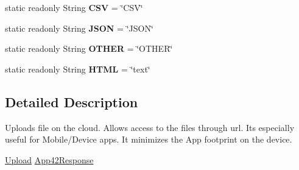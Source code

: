 \begin{DoxyCompactItemize}
\item 
\hypertarget{classcom_1_1shephertz_1_1app42_1_1paas_1_1sdk_1_1windows_1_1upload_1_1_upload_file_type_ac5126d7599593fc0a2a886ef81642c57}{static readonly String {\bfseries C\+S\+V} = \char`\"{}C\+S\+V\char`\"{}}\label{classcom_1_1shephertz_1_1app42_1_1paas_1_1sdk_1_1windows_1_1upload_1_1_upload_file_type_ac5126d7599593fc0a2a886ef81642c57}

\item 
\hypertarget{classcom_1_1shephertz_1_1app42_1_1paas_1_1sdk_1_1windows_1_1upload_1_1_upload_file_type_a92d4c8543bb23be8ea4b3d39267523f0}{static readonly String {\bfseries J\+S\+O\+N} = \char`\"{}J\+S\+O\+N\char`\"{}}\label{classcom_1_1shephertz_1_1app42_1_1paas_1_1sdk_1_1windows_1_1upload_1_1_upload_file_type_a92d4c8543bb23be8ea4b3d39267523f0}

\item 
\hypertarget{classcom_1_1shephertz_1_1app42_1_1paas_1_1sdk_1_1windows_1_1upload_1_1_upload_file_type_a3ef399205ff0820c7bd562d861560da7}{static readonly String {\bfseries O\+T\+H\+E\+R} = \char`\"{}O\+T\+H\+E\+R\char`\"{}}\label{classcom_1_1shephertz_1_1app42_1_1paas_1_1sdk_1_1windows_1_1upload_1_1_upload_file_type_a3ef399205ff0820c7bd562d861560da7}

\item 
\hypertarget{classcom_1_1shephertz_1_1app42_1_1paas_1_1sdk_1_1windows_1_1upload_1_1_upload_file_type_ad1b395d57ab0e2f41da31d4e8b5e1bb1}{static readonly String {\bfseries H\+T\+M\+L} = \char`\"{}text\char`\"{}}\label{classcom_1_1shephertz_1_1app42_1_1paas_1_1sdk_1_1windows_1_1upload_1_1_upload_file_type_ad1b395d57ab0e2f41da31d4e8b5e1bb1}

\end{DoxyCompactItemize}


\subsection{Detailed Description}
Uploads file on the cloud. Allows access to the files through url. Its especially useful for Mobile/\+Device apps. It minimizes the App footprint on the device. 

\hyperlink{classcom_1_1shephertz_1_1app42_1_1paas_1_1sdk_1_1windows_1_1upload_1_1_upload_service}{Upload} \hyperlink{classcom_1_1shephertz_1_1app42_1_1paas_1_1sdk_1_1windows_1_1upload_1_1_upload_service}{App42\+Response} 